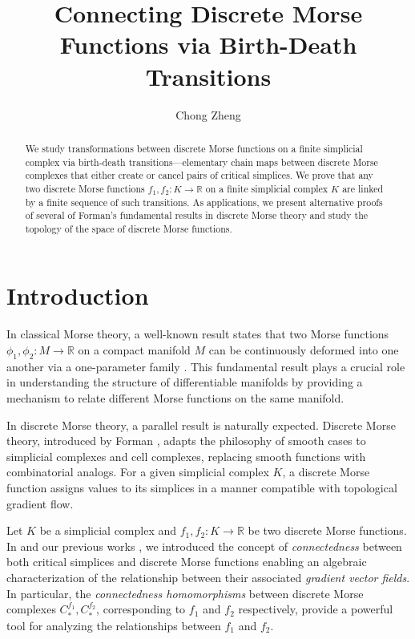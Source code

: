 \documentclass[a4paper,12pt,notitlepage]{amsart}
\title{Connecting Discrete Morse Functions via Birth-Death Transitions}
\author{Chong Zheng}
\theoremstyle{definition}%
\theoremstyle{definition}%
\theoremstyle{definition}%
\newcommand{\R}{\mathbb{R}}
\begin{document}
\begin{abstract}
 We study transformations 
 between discrete Morse functions on a finite simplicial complex via birth-death transitions—elementary chain maps between discrete Morse 
 complexes that  either create or cancel pairs of critical simplices.
We prove that any two discrete Morse
functions
$f_1,f_2:K \to \R$ on a finite simplicial complex 
$K$ 
are linked by a finite sequence of such transitions.
As  applications, we present alternative proofs 
of several of Forman’s fundamental results in discrete Morse theory
and study the topology  of  the space of discrete Morse functions.
\end{abstract}
\maketitle

\section{Introduction}
In classical Morse theory,
a well-known result states that  
two Morse functions $\phi_1, \phi_2:M \to \R$
on a compact manifold $M$
can be continuously deformed into one another via a one-parameter 
family \cite{cerf,cerf2}.
 This fundamental result 
 plays a crucial role in understanding 
 the structure of differentiable manifolds
  by providing a mechanism to relate different Morse functions on the same manifold. 

In discrete Morse theory, 
a  parallel result is naturally expected.
Discrete Morse theory, 
introduced by Forman \cite{Forman_guide, Morse Theory for Cell Complexes}, 
adapts  the philosophy of 
smooth cases  to simplicial complexes and cell complexes, 
replacing smooth functions with combinatorial analogs.
For a given simplicial complex 
$K$, 
a discrete Morse function assigns values to its simplices in a manner compatible
 with topological gradient flow.

Let $K$ be a simplicial complex
and $f_1, f_2:K \to \R$ be two discrete Morse functions. 
In \cite{birth and death} and our previous works \cite{no.1,no.2},  
we introduced   the concept of  \textit{connectedness} between both
critical simplices and discrete Morse functions 
enabling 
an algebraic characterization of the relationship between their associated \textit{gradient vector fields}. 
In particular,
the \textit{connectedness homomorphisms}
between discrete Morse complexes
$C_{\ast}^{f_1}, C_{\ast}^{f_2}$,
corresponding  to $f_1$ and $f_2$ respectively,
provide a powerful tool for analyzing the relationships between 
$f_1$ and $f_2$.
\end{document}
